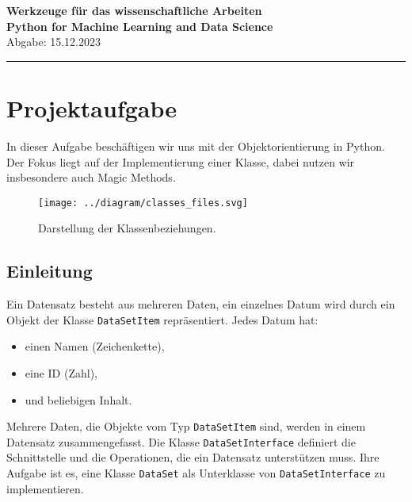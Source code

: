 \documentclass[a4paper,12pt]{article}
\begin{document}
\begin{titlepage}
    \centering
    \vspace*{2cm}
    {\bfseries\Large Werkzeuge für das wissenschaftliche Arbeiten\\}
    \vspace{0.5cm}
    \textbf{Python for Machine Learning and Data Science}\\
    \vspace{1cm}
    Abgabe: 15.12.2023\\
    \vspace{2cm}
    \hrule \vspace{0.5cm}
\end{titlepage}

\tableofcontents
\newpage

\section{Projektaufgabe}
In dieser Aufgabe beschäftigen wir uns mit der Objektorientierung in Python. Der Fokus liegt auf der Implementierung einer Klasse, dabei nutzen wir insbesondere auch Magic Methods.

\begin{figure}[h!]
    \centering
    \texttt{[image: ../diagram/classes\_files.svg]}
    \caption{Darstellung der Klassenbeziehungen.}
    \label{fig:classes}
\end{figure}

\subsection{Einleitung}
Ein Datensatz besteht aus mehreren Daten, ein einzelnes Datum wird durch ein Objekt der Klasse \texttt{DataSetItem} repräsentiert. Jedes Datum hat:
\begin{itemize}
    \item einen Namen (Zeichenkette),
    \item eine ID (Zahl),
    \item und beliebigen Inhalt.
\end{itemize}

Mehrere Daten, die Objekte vom Typ \texttt{DataSetItem} sind, werden in einem Datensatz zusammengefasst. Die Klasse \texttt{DataSetInterface} definiert die Schnittstelle und die Operationen, die ein Datensatz unterstützen muss. Ihre Aufgabe ist es, eine Klasse \texttt{DataSet} als Unterklasse von \texttt{DataSetInterface} zu implementieren.
\end{document}
